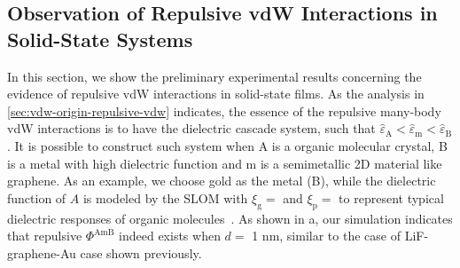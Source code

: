 
\subsection{Observation of Repulsive vdW Interactions in Solid-State Systems}
\label{sec:vdw-observ-repuls-vdw}


In this section, we show the preliminary experimental results
concerning the evidence of repulsive vdW interactions in solid-state
films.
%
As the analysis in \autoref{sec:vdw-origin-repulsive-vdw} indicates,
the essence of the repulsive many-body vdW interactions is to have the
dielectric cascade system, such that
$\hat{\varepsilon}_{\mathrm{A}} < \hat{\varepsilon}_{\mathrm{m}} <
\hat{\varepsilon}_{\mathrm{B}}$.
%
It is possible to construct such system when A is a organic molecular
crystal, B is a metal with high dielectric function and m is a
semi\-metallic 2D material like graphene.
%
As an example, we choose gold as the metal (B), while the dielectric
function of $A$ is modeled by the SLOM with $\xi_{\mathrm{g}}=$
 and $\xi_{\mathrm{p}}=$  to represent
typical dielectric responses of organic molecules~.
%
As shown in a, our simulation indicates that
repulsive $\Phi^{\mathrm{AmB}}$ indeed exists when $d=$ 1
nm, similar to the case of LiF-graphene-Au
case shown previously.
%

